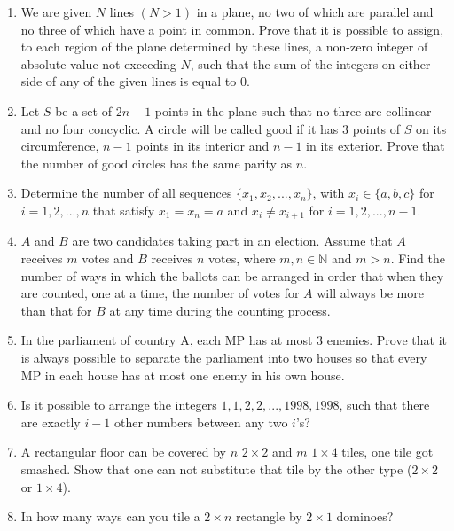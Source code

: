 \documentclass[12pt]{scrartcl}
\begin{document}
\begin{enumerate}[resume]
    \item We are given $N$ lines $(N>1)$ in a plane, no two of which are parallel and no three of which have a point in common. Prove that it is possible to assign, to each region of the plane determined by these lines, a non-zero integer of absolute value not exceeding $N$, such that the sum of the integers on either side of any of the given lines is equal to 0.

    \item Let $S$ be a set of $2n+1$ points in the plane such that no three are collinear and no four concyclic. A circle will be called good if it has 3 points of $S$ on its circumference, $n-1$ points in its interior and $n-1$ in its exterior. Prove that the number of good circles has the same parity as $n$.
    

    \item Determine the number of all sequences $\{x_{1},x_{2},...,x_{n}\}$, with $x_{i}\in\{a,b,c\}$ for $i=1,2,...,n$ that satisfy $x_{1}=x_{n}=a$ and $x_{i}\ne x_{i+1}$ for $i=1,2,...,n-1$.

    \item $A$ and $B$ are two candidates taking part in an election. Assume that $A$ receives $m$ votes and $B$ receives $n$ votes, where $m, n\in\mathbb{N}$ and $m>n.$ Find the number of ways in which the ballots can be arranged in order that when they are counted, one at a time, the number of votes for $A$ will always be more than that for $B$ at any time during the counting process.

    \item In the parliament of country A, each MP has at most 3 enemies. Prove that it is always possible to separate the parliament into two houses so that every MP in each house has at most one enemy in his own house.

    \item Is it possible to arrange the integers $1,1,2,2,..., 1998, 1998$, such that there are exactly $i-1$ other numbers between any two $i$'s?

    \item A rectangular floor can be covered by $n$ $2\times2$ and $m$ $1\times4$ tiles, one tile got smashed. Show that one can not substitute that tile by the other type ($2\times2$ or $1\times4$).

    \item In how many ways can you tile a $2\times n$ rectangle by $2\times1$ dominoes?


\end{enumerate}
\end{document}
